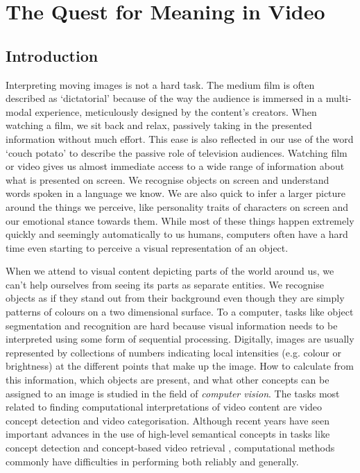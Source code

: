 \chapter{The Quest for Meaning in Video}
\label{ch:meaning_in_video}

\section{Introduction} %
\label{sec:meaning_in_video_introduction}

Interpreting moving images is not a hard task. The medium film is often described as `dictatorial' because of the way the audience is immersed in a multi-modal experience, meticulously designed by the content's creators. When watching a film, we sit back and relax, passively taking in the presented information without much effort. This ease is also reflected in our use of the word `couch potato' to describe the passive role of television audiences. Watching film or video gives us almost immediate access to a wide range of information about what is presented on screen. We recognise objects on screen and understand words spoken in a language we know. We are also quick to infer a larger picture around the things we perceive, like personality traits of characters on screen and our emotional stance towards them. While most of these things happen extremely quickly and seemingly automatically to us humans, computers often have a hard time even starting to perceive a visual representation of an object.

When we attend to visual content depicting parts of the world around us, we can't help ourselves from seeing its parts as separate entities. We recognise objects as if they stand out from their background even though they are simply patterns of colours on a two dimensional surface. To a computer, tasks like object segmentation and recognition are hard because visual information needs to be interpreted using some form of sequential processing. Digitally, images are usually represented by collections of numbers indicating local intensities (e.g. colour or brightness) at the different points that make up the image. How to calculate from this information, which objects are present, and what other concepts can be assigned to an image is studied in the field of \emph{computer vision}. The tasks most related to finding computational interpretations of video content are video concept detection and video categorisation. Although recent years have seen important advances in the use of high-level semantical concepts in tasks like concept detection and concept-based video retrieval \cite{Snoek:2009dq, Snoek:jf, Worring:2007vm, Chang:2008wh}, computational methods commonly have difficulties in performing both reliably and generally\cite{Urban:2006up, Snoek:2009dq}.

